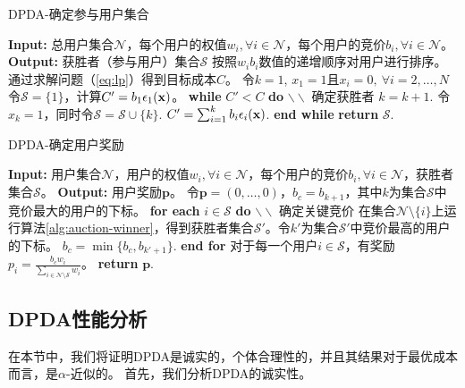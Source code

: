 	\begin{algorithm}
		\caption{DPDA-确定参与用户集合}
		\label{alg:auction-winner}
		\begin{algorithmic}[1]
			\STATE \textbf{Input:} 总用户集合$\mathcal{N}$，每个用户的权值$w_i, \forall i\in\mathcal{N}$，每个用户的竞价$b_i, \forall i\in\mathcal{N}$。
			\STATE \textbf{Output:} 获胜者（参与用户）集合$\mathcal{S}$
			\STATE 按照$w_ib_i$数值的递增顺序对用户进行排序。
			\STATE 通过求解问题（\ref{eq:lp}）得到目标成本$C$。
			\STATE 令$k=1$, $x_1=1$且$x_i=0,~\forall i=2,\dots,N$
			\STATE 令$\mathcal{S}=\{1\}$，计算$C'=b_1\epsilon_1(\mathbf{x})$。
			\STATE \textbf{while} $C'<C$ \textbf{do} $\backslash\backslash$ 确定获胜者
			\STATE \quad $k=k+1$. 
			\STATE \quad 令$x_k=1$，同时令$\mathcal{S}=\mathcal{S}\cup\{k\}$.
			\STATE \quad $C'=\sum_{i=1}^kb_i\epsilon_i(\mathbf{x})$.
			\STATE \textbf{end while}
			\STATE \textbf{return} $\mathcal{S}$.
		\end{algorithmic}
	\end{algorithm}
	
	\begin{algorithm}
		\caption{DPDA-确定用户奖励}
		\label{alg:auction-payment}
		\begin{algorithmic}[1]
			\STATE \textbf{Input:} 用户集合$\mathcal{N}$，用户的权值$w_i, \forall i\in\mathcal{N}$，每个用户的竞价$b_i, \forall i\in\mathcal{N}$，获胜者集合$\mathcal{S}$。
			\STATE \textbf{Output:} 用户奖励$\mathbf{p}$。
			\STATE 令$\mathbf{p}=(0,\dots,0)$，$b_c=b_{k+1}$，其中$k$为集合$\mathcal{S}$中竞价最大的用户的下标。
			\STATE \textbf{for each} $i\in\mathcal{S}$ \textbf{do} $\backslash\backslash$ 确定关键竞价			\STATE \quad 在集合$\mathcal{N}\setminus\{i\}$上运行算法\ref{alg:auction-winner}，得到获胜者集合$\mathcal{S}'$。令$k'$为集合$\mathcal{S}'$中竞价最高的用户的下标。 
			\STATE \quad $b_c=\min\{b_c, b_{k'+1}\}$.
			\STATE \textbf{end for}
			\STATE 对于每一个用户$i\in\mathcal{S}$，有奖励$p_i=\frac{b_{c}w_i}{\sum_{i\in\mathcal{N}\setminus\mathcal{S}}w_i}$。
			\STATE \textbf{return} $\mathbf{p}$.
		\end{algorithmic}
	\end{algorithm}
	
	
	
	\subsection{DPDA性能分析}\label{sec:analysis}
	在本节中，我们将证明DPDA是诚实的，个体合理性的，并且其结果对于最优成本而言，是$\alpha$-近似的。
	首先，我们分析DPDA的诚实性。
	
